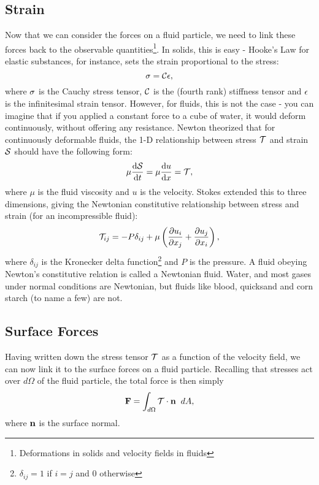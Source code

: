 \subsection{Strain}
Now that we can consider the forces on a fluid particle, we need to link these forces back to the observable quantities\footnote{Deformations in solids and velocity fields in fluids}. In solids, this is easy - Hooke's Law for elastic substances, for instance, sets the strain proportional to the stress:
\begin{equation}
\mathbf{\sigma} = \mathcal{C}\mathbf{\epsilon},
\end{equation}
where $\mathbf{\sigma}$ is the Cauchy stress tensor, $\mathcal{C}$ is the (fourth rank) stiffness tensor and $\mathbf{\epsilon}$ is the infinitesimal strain tensor. However, for fluids, this is not the case - you can imagine that if you applied a constant force to a cube of water, it would deform continuously, without offering any resistance. Newton theorized that for continuously deformable fluids, the 1-D relationship between stress $\mathcal{T}$ and strain $\mathcal{S}$ should have the following form:
\begin{equation}
\mu \der{1}{\Tensor{S}}{t} = \mu \der{1}{u}{x}=\Tensor{T}, 
\end{equation}
where $\mu$ is the fluid viscosity and $u$ is the velocity.  Stokes extended this to three dimensions, giving the Newtonian constitutive relationship between stress and strain (for an incompressible fluid):
\begin{equation}\label{eq:constitutive}
\Tensor{T}_{ij} = -P\delta_{ij} + \mu\paren{\pder{1}{u_{i}}{x_j} + \pder{1}{u_j}{x_i}},
\end{equation}
where $\delta_{ij}$ is the Kronecker delta function\footnote{$\delta_{ij} = 1$ if $i=j$ and $0$ otherwise} and $P$ is the pressure. A fluid obeying Newton's constitutive relation is called a Newtonian fluid. Water, and most gases under normal conditions are Newtonian, but fluids like blood, quicksand and corn starch (to name a few) are not. 

\subsection{Surface Forces}
Having written down the stress tensor $\mathcal{T}$ as a function of the velocity field, we can now link it to the surface forces on a fluid particle. Recalling that stresses act over $d\Omega$ of the fluid particle, the total force is then simply 
\begin{equation}\label{eq:surfaceForce}
\Vector{F} = \int{d\Omega}{}{\Tensor{T}\cdot\Vector{n}}{dA},
\end{equation}
where $\mathbf{n}$ is the surface normal. 

